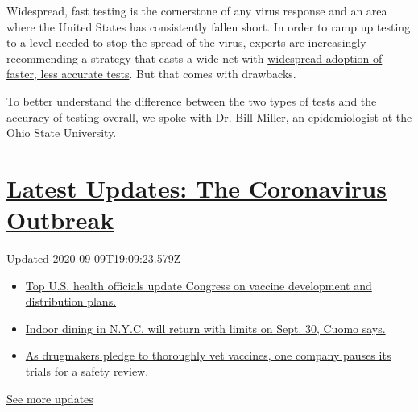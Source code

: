 Widespread, fast testing is the cornerstone of any virus response and an
area where the United States has consistently fallen short. In order to
ramp up testing to a level needed to stop the spread of the virus,
experts are increasingly recommending a strategy that casts a wide net
with
\href{https://www.nytimes3xbfgragh.onion/2020/08/06/health/rapid-Covid-tests.html}{widespread
adoption of faster, less accurate tests}. But that comes with drawbacks.

To better understand the difference between the two types of tests and
the accuracy of testing overall, we spoke with Dr. Bill Miller, an
epidemiologist at the Ohio State University.

\hypertarget{latest-updates-the-coronavirus-outbreak}{%
\section{\texorpdfstring{\href{https://www.nytimes3xbfgragh.onion/2020/09/09/world/covid-19-coronavirus.html?action=click\&pgtype=Article\&state=default\&region=MAIN_CONTENT_1\&context=storylines_live_updates}{Latest
Updates: The Coronavirus
Outbreak}}{Latest Updates: The Coronavirus Outbreak}}\label{latest-updates-the-coronavirus-outbreak}}

Updated 2020-09-09T19:09:23.579Z

\begin{itemize}
\tightlist
\item
  \href{https://www.nytimes3xbfgragh.onion/2020/09/09/world/covid-19-coronavirus.html?action=click\&pgtype=Article\&state=default\&region=MAIN_CONTENT_1\&context=storylines_live_updates\#link-279e24e2}{Top
  U.S. health officials update Congress on vaccine development and
  distribution plans.}
\item
  \href{https://www.nytimes3xbfgragh.onion/2020/09/09/world/covid-19-coronavirus.html?action=click\&pgtype=Article\&state=default\&region=MAIN_CONTENT_1\&context=storylines_live_updates\#link-792ae257}{Indoor
  dining in N.Y.C. will return with limits on Sept. 30, Cuomo says.}
\item
  \href{https://www.nytimes3xbfgragh.onion/2020/09/09/world/covid-19-coronavirus.html?action=click\&pgtype=Article\&state=default\&region=MAIN_CONTENT_1\&context=storylines_live_updates\#link-5b0bf0d1}{As
  drugmakers pledge to thoroughly vet vaccines, one company pauses its
  trials for a safety review.}
\end{itemize}

\href{https://www.nytimes3xbfgragh.onion/2020/09/09/world/covid-19-coronavirus.html?action=click\&pgtype=Article\&state=default\&region=MAIN_CONTENT_1\&context=storylines_live_updates}{See
more updates}


